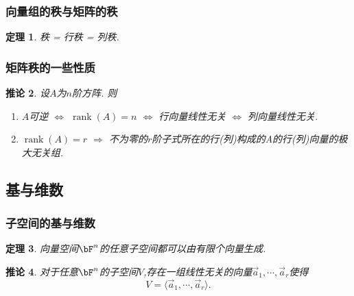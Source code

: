 \documentclass{article}
\DeclareMathOperator{\rank}{rank}
\newtheorem{theorem}{定理}  %
\newtheorem{corollary}[theorem]{推论}
\begin{document}
\subsubsection{向量组的秩与矩阵的秩}
\begin{theorem}
秩 = 行秩 = 列秩.
\end{theorem}

\subsubsection{矩阵秩的一些性质}
\begin{corollary}
设$A$为$n$阶方阵. 则
\begin{enumerate}
\item $A$可逆 $\Leftrightarrow$ $\rank(A)=n$ $\Leftrightarrow$ 行向量线性无关 $\Leftrightarrow$ 列向量线性无关.
\item $\rank(A)=r$ $\Rightarrow$ 不为零的$r$阶子式所在的行(列)构成的A的行(列)向量的极大无关组.
\end{enumerate}
\end{corollary}


\subsection{基与维数}

\subsubsection{子空间的基与维数}
\begin{theorem}
向量空间$\bF^n$的任意子空间都可以由有限个向量生成.
\end{theorem}
\begin{corollary}
对于任意$\bF^n$的子空间$V$,存在一组线性无关的向量$\vec{a}_1,\cdots,\vec{a}_r$使得
\[V= \langle\vec{a}_1,\cdots,\vec{a}_r\rangle.\]
\end{corollary}
\end{document}
